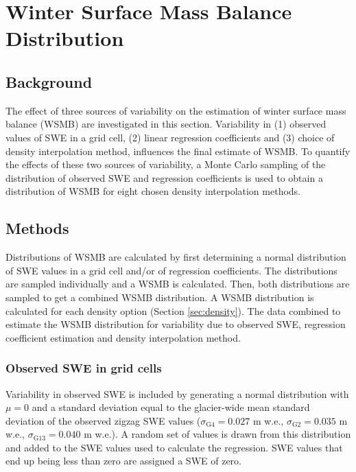 \documentclass[12pt]{article}
\begin{document}
\section{Winter Surface Mass Balance Distribution}
\label{sec:WSMBdistribution}

\subsection{Background}

The effect of three sources of variability on the estimation of winter surface mass balance (WSMB) are investigated in this section. Variability in (1) observed values of SWE in a grid cell, (2) linear regression coefficients and (3) choice of density interpolation method, influences the final estimate of WSMB. To quantify the effects of these two sources of variability, a Monte Carlo sampling of the distribution of observed SWE and regression coefficients is used to obtain a distribution of WSMB for eight chosen density interpolation methods.  

\subsection{Methods}

Distributions of WSMB are calculated by first determining a normal distribution of SWE values in a grid cell and/or of regression coefficients. The distributions are sampled individually and a WSMB is calculated. Then, both distributions are sampled to get a combined WSMB distribution. A WSMB distribution is calculated for each density option (Section \ref{sec:density}). The data combined to estimate the WSMB distribution for variability due to observed SWE, regression coefficient estimation and density interpolation method. 

\subsubsection{Observed SWE in grid cells}

Variability in observed SWE is included by generating a normal distribution with $\mu=0$ and a standard deviation equal to the glacier-wide mean standard deviation of the observed zigzag SWE values ($\sigma_{\mathrm{G4}} = 0.027 $ m w.e., $\sigma_{\mathrm{G2}} = 0.035$ m w.e., $\sigma_{\mathrm{G13}} = 0.040 $ m w.e.). A random set of values is drawn from this distribution and added to the SWE values used to calculate the regression. SWE values that end up being less than zero are assigned a SWE of zero.
\end{document}
